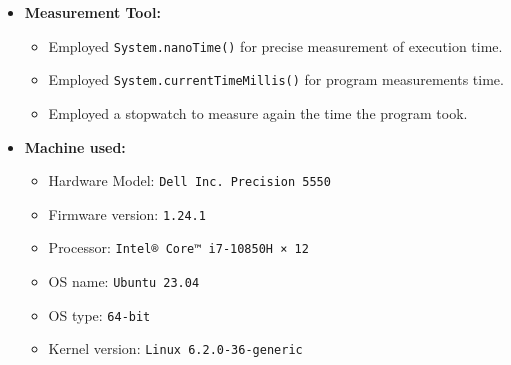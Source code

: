\documentclass{article}
\begin{document}
\begin{itemize}
  \item \textbf{Measurement Tool:}
    \begin{itemize}
      \item Employed \texttt{System.nanoTime()} for precise measurement of execution time.
      \item Employed \texttt{System.currentTimeMillis()} for program measurements time. 
      \item Employed a stopwatch to measure again the time the program took.
    \end{itemize}
    
    \item \textbf{Machine used:}
    \begin{itemize}
      \item Hardware Model: \texttt{Dell Inc. Precision 5550}
      \item Firmware version: \texttt{1.24.1}
      \item Processor: \texttt{Intel® Core™ i7-10850H × 12}
      \item OS name: \texttt{Ubuntu 23.04}
      \item OS type: \texttt{64-bit}
      \item Kernel version: \texttt{Linux 6.2.0-36-generic}
    \end{itemize}
\end{itemize}
\end{document}
